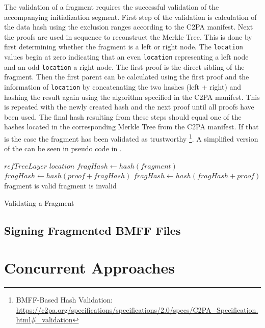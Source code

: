 The validation of a fragment requires the successful validation of the accompanying initialization segment. First step of the validation is calculation of the data hash using the exclusion ranges according to the C2PA manifest. Next the proofs are used in sequence to reconstruct the Merkle Tree. This is done by first determining whether the fragment is a left or right node. The \texttt{location} values begin at zero indicating that an even \texttt{location} representing a left node and an odd \texttt{location} a right node. The first proof is the direct sibling of the fragment. Then the first parent can be calculated using the first proof and the information of \texttt{location} by concatenating the two hashes (left + right) and hashing the result again using the algorithm specified in the C2PA manifest. This is repeated with the newly created hash and the next proof until all proofs have been used. The final hash resulting from these steps should equal one of the hashes located in the corresponding Merkle Tree from the C2PA manifest. If that is the case the fragment has been validated as trustworthy \footnote{BMFF-Based Hash Validation: \url{https://c2pa.org/specifications/specifications/2.0/specs/C2PA_Specification.html\#_validation}}. A simplified version of the can be seen in pseudo code in .

\begin{algorithm}[H]
    \begin{algorithmic}[1]
        \Require $refTreeLayer$ 
        \Require $location$ 
        \State $fragHash \gets hash(fragment)$
                \State $fragHash \gets hash(proof + fragHash)$
            \Else
                \State $fragHash \gets hash(fragHash + proof)$
            \EndIf
        \EndFor
            \State fragment is valid
        \Else
            \State fragment is invalid
        \EndIf
    \end{algorithmic}
    \caption{Validating a Fragment}
    \label{alg:validate}
\end{algorithm}

\subsection{Signing Fragmented BMFF Files\label{sec:sign_bmff}}


\section{Concurrent Approaches}

